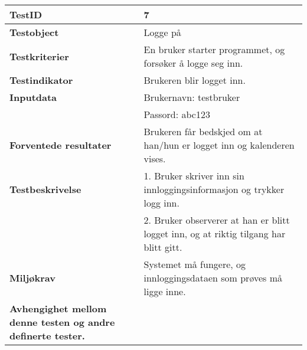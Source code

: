 	\begin{tabularx}{1.2\textwidth}{| p{5cm} | X |}
	\hline
	\textbf{TestID} 																& 7																	\\ \hline
	\textbf{Testobject} 															& Logge på															\\ \hline
	\textbf{Testkriterier} 															& En bruker starter programmet, og forsøker å logge seg inn.							\\ \hline
	\textbf{Testindikator} 															& Brukeren blir logget inn.													\\ \hline
	\textbf{Inputdata} 															& Brukernavn: testbruker													\\ 
																			& Passord: abc123														\\  \hline
	\textbf{Forventede resultater}									 				& Brukeren får bedskjed om at han/hun er logget inn og kalenderen vises.				\\ \hline
	\textbf{Testbeskrivelse} 														& 1. Bruker skriver inn sin innloggingsinformasjon og trykker logg inn.					\\
																			& 2. Bruker observerer at han er blitt logget inn, og at riktig tilgang har blitt gitt.					\\ \hline
	\textbf{Miljøkrav}			 												& Systemet må fungere, og innloggingsdataen som prøves må ligge inne.						\\ \hline
	\textbf{Avhengighet mellom denne testen og andre definerte tester.}		 				&				 													\\ \hline
	\end{tabularx}

\mbox{}\\

